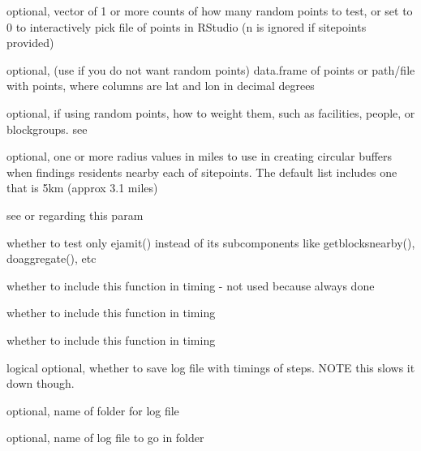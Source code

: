 \documentclass[a4paper]{book}
\begin{document}
\begin{Arguments}
\begin{ldescription}
\item[\code{n}] optional, vector of 1 or more counts of how many random points to test, or
set to 0 to interactively pick file of points in RStudio (n is ignored if sitepoints provided)

\item[\code{sitepoints}] optional,  (use if you do not want random points) data.frame of points or
path/file with points, where columns are lat and lon in decimal degrees

\item[\code{weighting}] optional, if using random points, how to weight them,
such as facilities, people, or blockgroups. see 

\item[\code{radii}] optional, one or more radius values in miles
to use in creating circular buffers when findings residents nearby each of sitepoints.
The default list includes one that is 5km (approx 3.1 miles)

\item[\code{avoidorphans}] see  or  regarding this param

\item[\code{test\_ejamit}] whether to test only ejamit()
instead of its subcomponents like getblocksnearby(), doaggregate(), etc

\item[\code{test\_getblocksnearby}] whether to include this function in timing - not used because always done

\item[\code{test\_doaggregate}] whether to include this function in timing

\item[\code{test\_batch.summarize}] whether to include this function in timing

\item[\code{logging}] logical optional, whether to save log file with timings of steps.
NOTE this slows it down though.

\item[\code{logfolder}] optional, name of folder for log file

\item[\code{logfilename}] optional, name of log file to go in folder


\end{ldescription}
\end{Arguments}
\end{document}
